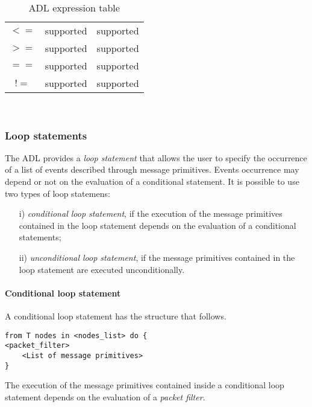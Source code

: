 \begin{table}
{\begin{tabular}{ccc}
$<=$		& supported		& supported	\\
$>=$		& supported		& supported	\\
$==$		& supported		& supported	\\
$!=$		& supported		& supported	\\
\bottomrule
\end{tabular}
}\\
\caption{ADL expression table}
\label{tab:expression-table}
\end{table}

\subsubsection{Loop statements}
The ADL provides a \emph{loop statement} that allows the user to specify the occurrence of a list of events described through message primitives. Events occurrence may depend or not on the evaluation of a conditional statement. It is possible to use two types of loop statemens:
%
\begin{itemize}
\item [i)] \emph{conditional loop statement}, if the execution of the message primitives contained in the loop statement depends on the evaluation of a conditional statements;
\item [ii)] \emph{unconditional loop statement}, if the message primitives contained in the loop statement are executed unconditionally.
\end{itemize}

\paragraph{Conditional loop statement}
A conditional loop statement has the structure that follows.
%
\begin{lstlisting}[language={adl}]
from T nodes in <nodes_list> do { 
<packet_filter>
    <List of message primitives>
}
\end{lstlisting}
%
The execution of the message primitives contained inside a conditional loop statement depends on the evaluation of a \emph{packet filter}. 

